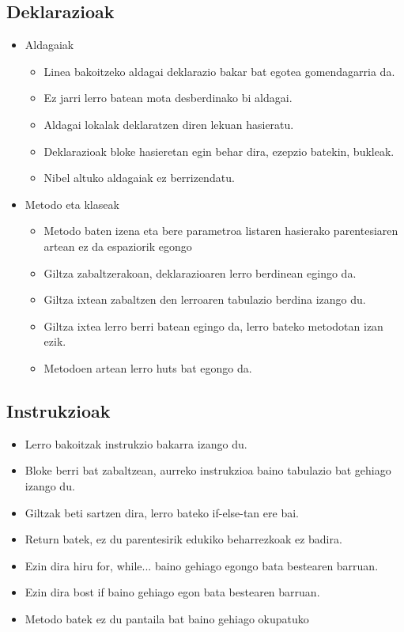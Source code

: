 \subsection{Deklarazioak}


	\begin{itemize}
	  \item Aldagaiak
	    \begin{itemize}
	      \item Linea bakoitzeko aldagai deklarazio bakar bat egotea gomendagarria da.
	      \item Ez jarri lerro batean mota desberdinako bi aldagai.
	      \item Aldagai lokalak deklaratzen diren lekuan hasieratu.
	      \item Deklarazioak bloke hasieretan egin behar dira{}, ezepzio batekin, bukleak.
	      \item Nibel altuko aldagaiak ez berrizendatu.
	    \end{itemize}
	  \item Metodo eta klaseak
	      \begin{itemize}
	      \item Metodo baten izena eta bere parametroa listaren hasierako parentesiaren artean ez da espaziorik egongo
	      \item Giltza zabaltzerakoan, deklarazioaren lerro berdinean egingo da.
	      \item Giltza ixtean zabaltzen den lerroaren tabulazio berdina izango du.
	      \item Giltza ixtea lerro berri batean egingo da, lerro bateko metodotan izan ezik.
	      \item Metodoen artean lerro huts bat egongo da.
	    \end{itemize}
	\end{itemize}
  
   


\subsection{Instrukzioak}
    \begin{itemize}
      \item Lerro bakoitzak instrukzio bakarra izango du.
      \item Bloke berri bat zabaltzean, aurreko instrukzioa baino tabulazio bat gehiago izango du.
      \item Giltzak beti sartzen dira, lerro bateko if-else-tan ere bai.
      \item Return batek, ez du parentesirik edukiko beharrezkoak ez badira.
      \item Ezin dira hiru for, while... baino gehiago egongo bata bestearen barruan.
      \item Ezin dira bost if baino gehiago egon bata bestearen barruan.
      \item Metodo batek ez du pantaila bat baino gehiago okupatuko
    \end{itemize}
  

